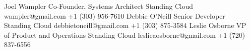 
\begin{referees}
		{Joel Wampler}
		{Co-Founder, Systems Architect}
		{Standing Cloud}
		{wampler@gmail.com}
    {+1 (303) 956-7610}
    {Debbie O'Neill}
    {Senior Developer}
    {Standing Cloud}
    {debbietoneill@gmail.com}
    {+1 (303) 875-3584}
  \newline
    {Leslie Osborne}
    {VP of Product and Operations}
    {Standing Cloud}
    {leslieaosborne@gmail.com}
    {+1 (720) 837-6556}
\end{referees}
